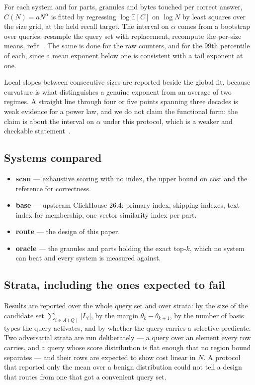 For each system and for parts, granules and bytes touched per correct answer,
$C(N) = aN^{\alpha}$ is fitted by regressing $\log \mathbb{E}[C]$ on $\log N$ by
least squares over the size grid, at the held recall target. The interval on
$\alpha$ comes from a bootstrap over queries: resample the query set with
replacement, recompute the per-size means, refit~\cite{efron1993bootstrap}. The
same is done for the raw counters, and for the 99th percentile of each, since a
mean exponent below one is consistent with a tail exponent at one.

Local slopes between consecutive sizes are reported beside the global fit,
because curvature is what distinguishes a genuine exponent from an average of
two regimes. A straight line through four or five points spanning three decades
is weak evidence for a power law, and we do not claim the functional form: the
claim is about the interval on $\alpha$ under this protocol, which is a weaker
and checkable statement~\cite{clauset2009powerlaw}.

\subsection{Systems compared}

\begin{itemize}[leftmargin=*,itemsep=1pt]
\item \textbf{scan} --- exhaustive scoring with no index, the upper bound on
  cost and the reference for correctness.
\item \textbf{base} --- upstream ClickHouse 26.4: primary index, skipping
  indexes, text index for membership, one vector similarity index per part.
\item \textbf{route} --- the design of this paper.
\item \textbf{oracle} --- the granules and parts holding the exact top-$k$,
  which no system can beat and every system is measured against.
\end{itemize}

\subsection{Strata, including the ones expected to fail}

Results are reported over the whole query set and over strata: by the size of
the candidate set $\sum_{i \in A(Q)}|L_i|$, by the margin
$\theta_k - \theta_{k+1}$, by the number of basis types the query activates,
and by whether the query carries a selective predicate. Two adversarial strata
are run deliberately --- a query over an element every row carries, and a query
whose score distribution is flat enough that no region bound separates --- and
their rows are expected to show cost linear in $N$. A protocol that reported
only the mean over a benign distribution could not tell a design that routes
from one that got a convenient query set.
